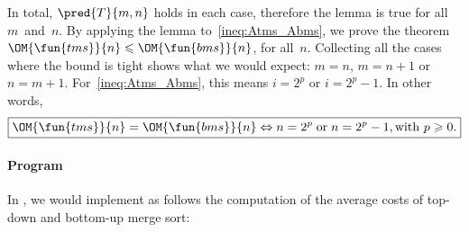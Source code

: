 In total, \(\pred{T}{m,n}\) holds in each case, therefore the lemma is
true for all \(m\)~and~\(n\). By applying the lemma
to~\eqref{ineq:Atms_Abms}, we prove the theorem \(\OM{\fun{tms}}{n}
\leqslant \OM{\fun{bms}}{n}\), for all~\(n\). Collecting all the cases
where the bound is tight shows what we would expect: \(m=n\),
\(m=n+1\) or \(n=m+1\). For~\eqref{ineq:Atms_Abms}, this means
\(i=2^p\) or \(i=2^p-1\). In other words,
\begin{equation*}
\boxed{\OM{\fun{tms}}{n} = \OM{\fun{bms}}{n} \Leftrightarrow n=2^p
  \;\text{or}\; n=2^p-1, \text{with \(p \geqslant
    0\)}.}
\end{equation*}

\paragraph{Program}

In \Erlang, we would implement as follows the computation of the
average costs of top\hyp{}down and bottom\hyp{}up merge sort:


